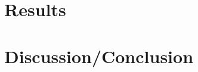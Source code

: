\documentclass[10pt,a4paper]{article}
\begin{document}
	\section{Results}
	\section{Discussion/Conclusion}	
	
	
%		
		
\end{document}
